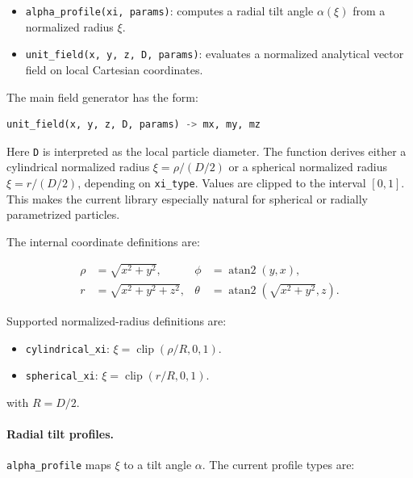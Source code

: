 \documentclass[11pt,a4paper]{article}
\begin{document}
\begin{itemize}[nosep]
    \item \texttt{alpha\_profile(xi, params)}: computes a radial tilt angle
    \(\alpha(\xi)\) from a normalized radius \(\xi\).
    \item \texttt{unit\_field(x, y, z, D, params)}: evaluates a normalized
    analytical vector field on local Cartesian coordinates.
\end{itemize}

The main field generator has the form:

\begin{lstlisting}[language=Python]
unit_field(x, y, z, D, params) -> mx, my, mz
\end{lstlisting}

Here \texttt{D} is interpreted as the local particle diameter. The function
derives either a cylindrical normalized radius
\(\xi = \rho / (D/2)\) or a spherical normalized radius
\(\xi = r / (D/2)\), depending on \texttt{xi\_type}. Values are clipped to
the interval \([0, 1]\). This makes the current library especially natural for
spherical or radially parametrized particles.

The internal coordinate definitions are:

\begin{align*}
    \rho &= \sqrt{x^2 + y^2}, &
    \phi &= \operatorname{atan2}(y, x), \\
    r &= \sqrt{x^2 + y^2 + z^2}, &
    \theta &= \operatorname{atan2}\left(\sqrt{x^2 + y^2}, z\right).
\end{align*}

Supported normalized-radius definitions are:

\begin{itemize}[nosep]
    \item \texttt{cylindrical\_xi}: \(\xi = \operatorname{clip}(\rho/R, 0, 1)\).
    \item \texttt{spherical\_xi}: \(\xi = \operatorname{clip}(r/R, 0, 1)\).
\end{itemize}

with \(R = D/2\).

\paragraph{Radial tilt profiles.}

\texttt{alpha\_profile} maps \(\xi\) to a tilt angle \(\alpha\). The current
profile types are:
\end{document}
